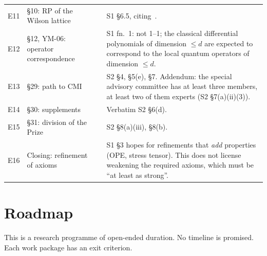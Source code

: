 \documentclass[11pt,a4paper]{article}
\begin{document}
\begin{center}
\begin{longtable}{@{}p{0.7cm}P{2.3cm}p{1.9cm}p{10.3cm}@{}}
E11 & \S10: RP of the Wilson lattice &  & S1 \S6.5, citing~\cite{OSe78}.\\
E12 & \S12, YM-06: operator correspondence &  & S1 fn.~1: not 1--1; the classical differential polynomials of dimension $\le d$ are expected to correspond to the local quantum operators of dimension $\le d$.\\
E13 & \S29: path to CMI &  & S2 \S4, \S5(e), \S7. Addendum: the special advisory committee has at least three members, at least two of them experts (S2 \S7(a)(ii)(3)).\\
E14 & \S30: supplements &  & Verbatim S2 \S6(d).\\
E15 & \S31: division of the Prize &  & S2 \S8(a)(iii), \S8(b).\\
E16 & Closing: refinement of axioms &  & S1 \S3 hopes for refinements that \emph{add} properties (OPE, stress tensor). This does not license weakening the required axioms, which must be \enquote{at least as strong}.\\
\end{longtable}
\end{center}

\section{Roadmap}\label{sec:roadmap}

This is a research programme of open-ended duration. No timeline is promised. Each work package has an exit criterion.
\end{document}

